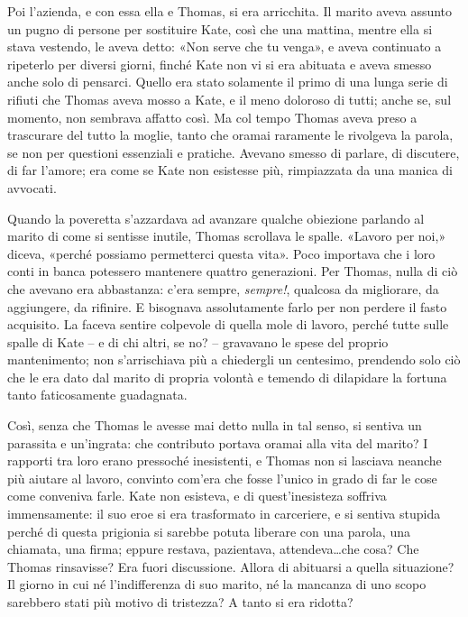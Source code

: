Poi l'azienda, e con essa ella e Thomas, si era arricchita. Il marito aveva assunto un pugno di
persone per sostituire Kate, così che una mattina, mentre ella si stava vestendo, le aveva detto:
«Non serve che tu venga», e aveva continuato a ripeterlo per diversi giorni, finché Kate non vi si
era abituata e aveva smesso anche solo di pensarci. Quello era stato solamente il primo di una lunga
serie di rifiuti che Thomas aveva mosso a Kate, e il meno doloroso di tutti; anche se, sul momento,
non sembrava affatto così. Ma col tempo Thomas aveva preso a trascurare del tutto la moglie, tanto
che oramai raramente le rivolgeva la parola, se non per questioni essenziali e pratiche. Avevano
smesso di parlare, di discutere, di far l'amore; era come se Kate non esistesse più, rimpiazzata da
una manica di avvocati.

Quando la poveretta s'azzardava ad avanzare qualche obiezione parlando al marito di come si sentisse
inutile, Thomas scrollava le spalle. «Lavoro per noi,» diceva, «perché possiamo permetterci questa
vita». Poco importava che i loro conti in banca potessero mantenere quattro generazioni. Per Thomas,
nulla di ciò che avevano era abbastanza: c'era sempre, \emph{sempre!}, qualcosa da migliorare, da
aggiungere, da rifinire. E bisognava assolutamente farlo per non perdere il fasto acquisito. La
faceva sentire colpevole di quella mole di lavoro, perché tutte sulle spalle di Kate -- e di chi
altri, se no? -- gravavano le spese del proprio mantenimento; non s'arrischiava più a chiedergli un
centesimo, prendendo solo ciò che le era dato dal marito di propria volontà e temendo di dilapidare
la fortuna tanto faticosamente guadagnata.

Così, senza che Thomas le avesse mai detto nulla in tal senso, si sentiva un parassita e un'ingrata:
che contributo portava oramai alla vita del marito? I rapporti tra loro erano pressoché inesistenti,
e Thomas non si lasciava neanche più aiutare al lavoro, convinto com'era che fosse l'unico in grado
di far le cose come conveniva farle. Kate non esisteva, e di quest'inesisteza soffriva immensamente:
il suo eroe si era trasformato in carceriere, e si sentiva stupida perché di questa prigionia si
sarebbe potuta liberare con una parola, una chiamata, una firma; eppure restava, pazientava,
attendeva\dots che cosa? Che Thomas rinsavisse? Era fuori discussione. Allora di abituarsi a quella
situazione? Il giorno in cui né l'indifferenza di suo marito, né la mancanza di uno scopo sarebbero
stati più motivo di tristezza? A tanto si era ridotta?

